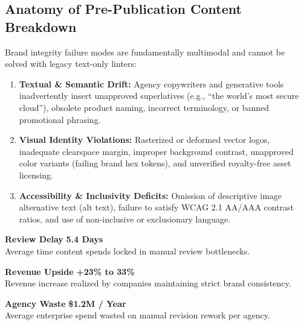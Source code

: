 \documentclass[10pt,a4paper]{article}
\begin{document}
\vspace{0.15cm}

\subsection{Anatomy of Pre-Publication Content Breakdown}
\small Brand integrity failure modes are fundamentally multimodal and cannot be solved with legacy text-only linters:
\begin{enumerate}[leftmargin=*,itemsep=2pt]
  \item \textbf{Textual \& Semantic Drift:} Agency copywriters and generative tools inadvertently insert unapproved superlatives (e.g., ``the world's most secure cloud''), obsolete product naming, incorrect terminology, or banned promotional phrasing.
  \item \textbf{Visual Identity Violations:} Rasterized or deformed vector logos, inadequate clearspace margin, improper background contrast, unapproved color variants (failing brand hex tokens), and unverified royalty-free asset licensing.
  \item \textbf{Accessibility \& Inclusivity Deficits:} Omission of descriptive image alternative text (alt text), failure to satisfy WCAG 2.1 AA/AAA contrast ratios, and use of non-inclusive or exclusionary language.
\end{enumerate}

\vspace{0.1cm}

\noindent
\begin{minipage}[t]{0.315\textwidth}
  \begin{metriccard}{\textbf{Review Delay}}{}
    \centering
    {\large\textbf{\color{alertred}5.4 Days}}\\[1pt]
    \footnotesize Average time content spends locked in manual review bottlenecks.
  \end{metriccard}
\end{minipage}
\hfill
\begin{minipage}[t]{0.315\textwidth}
  \begin{metriccard}{\textbf{Revenue Upside}}{}
    \centering
    {\large\textbf{\color{successgreen}+23\% to 33\%}}\\[1pt]
    \footnotesize Revenue increase realized by companies maintaining strict brand consistency.
  \end{metriccard}
\end{minipage}
\hfill
\begin{minipage}[t]{0.315\textwidth}
  \begin{metriccard}{\textbf{Agency Waste}}{}
    \centering
    {\large\textbf{\color{alertamber}\$1.2M / Year}}\\[1pt]
    \footnotesize Average enterprise spend wasted on manual revision rework per agency.
  \end{metriccard}
\end{minipage}
\end{document}
